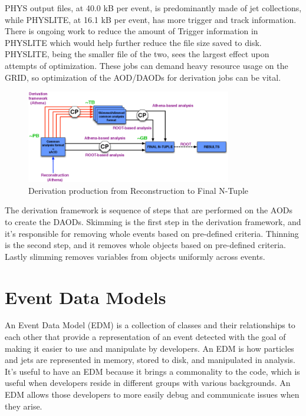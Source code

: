 PHYS output files, at 40.0 kB per event, is predominantly made of jet collections, while PHYSLITE, at 16.1 kB per event, has more trigger and track information.
There is ongoing work to reduce the amount of Trigger information in PHYSLITE which would help further reduce the file size saved to disk.
PHYSLITE, being the smaller file of the two, sees the largest effect upon attempts of optimization. 
These jobs can demand heavy resource usage on the GRID, so optimization of the AOD/DAODs for derivation jobs can be vital. 

\begin{figure}[h]
    \centering
    \includegraphics[width=0.8\textwidth]{content/img/catmore-derivation.png}
    \caption{Derivation production from Reconstruction to Final N-Tuple\cite{DAOD_Laycock_2014}}
    \label{fig:IO_derivation_framework}
\end{figure}

The derivation framework is sequence of steps that are performed on the AODs to create the DAODs.
Skimming is the first step in the derivation framework, and it's responsible for removing whole events based on pre-defined criteria.
Thinning is the second step, and it removes whole objects based on pre-defined criteria.
Lastly slimming removes variables from objects uniformly across events. 


\section{Event Data Models} \label{sec:IO_EDM}
An Event Data Model (EDM) is a collection of classes and their relationships to each other that provide a representation of an event detected with the goal of making it easier to use and manipulate by developers.
An EDM is how particles and jets are represented in memory, stored to disk, and manipulated in analysis.
It's useful to have an EDM because it brings a commonality to the code, which is useful when developers reside in different groups with various backgrounds.
An EDM allows those developers to more easily debug and communicate issues when they arise.  

